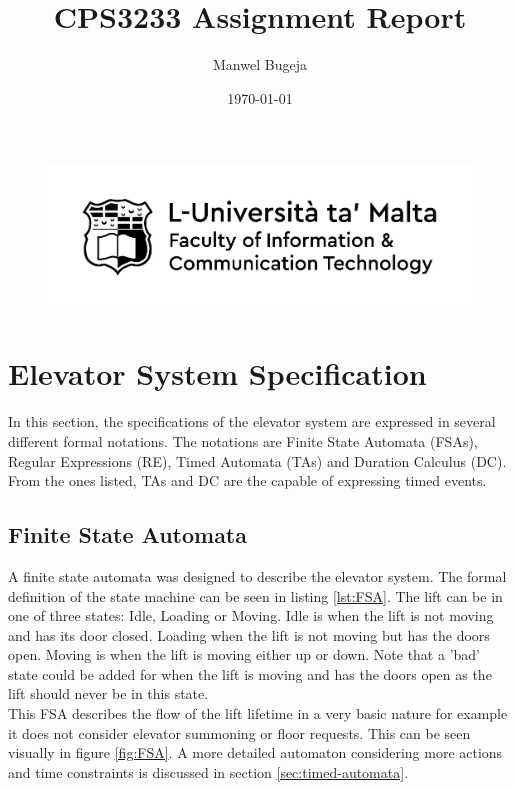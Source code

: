 \documentclass[a4paper, 12pt]{article}
\begin{document}
\begin{figure}
    \centering
    \includegraphics[width=1\textwidth]{Logo}
\end{figure}

\title{CPS3233 Assignment Report}
\author{Manwel Bugeja}
\date{\today}
\maketitle
  
\tableofcontents
\newpage

\section{Elevator System Specification}
In this section, the specifications of the elevator system are expressed in several different formal notations. The notations are Finite State Automata (FSAs), Regular Expressions (RE), Timed Automata (TAs) and Duration Calculus (DC). From the ones listed, TAs and DC are the capable of expressing timed events. \\

\subsection{Finite State Automata}
A finite state automata was designed to describe the elevator system. The formal definition of the state machine can be seen in listing \ref{lst:FSA}. The lift can be in one of three states: Idle, Loading or Moving. Idle is when the lift is not moving and has its door closed. Loading when the lift is not moving but has the doors open. Moving is when the lift is moving either up or down. Note that a 'bad' state could be added for when the lift is moving and has the doors open as the lift should never be in this state. \\

This FSA describes the flow of the lift lifetime in a very basic nature for example it does not consider elevator summoning or floor requests. This can be seen visually in figure \ref{fig:FSA}. A more detailed automaton considering more actions and time constraints is discussed in section \ref{sec:timed-automata}.
\end{document}
